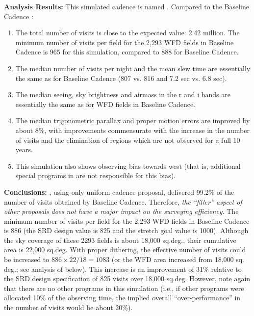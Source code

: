 {\bf Analysis Results:} This simulated cadence is named .
Compared to the Baseline Cadence :
\begin{enumerate}
\item The total number of visits is close to the expected value: 2.42
  million.  The minimum number of visits per field for the 2,293 WFD
  fields in Baseline Cadence is 965 for this simulation, compared to
  888 for Baseline Cadence.
\item The median number of visits per night and the mean slew time are
  essentially the same as for Baseline Cadence (807 vs. 816 and 7.2
  sec vs. 6.8 sec).
\item The median seeing, sky brightness and airmass in the r and i bands are
      essentially the same as for WFD fields in Baseline Cadence.
\item The median trigonometric parallax and proper motion errors are
  improved by about 8\%, with improvements commensurate with the
  increase in the number of visits and the elimination of regions
  which are not observed for a full 10 years.
\item This simulation also shows observing bias towards west (that is,
  additional special programs in  are not
  responsible for this bias).
\end{enumerate}


{\bf Conclusions:} , using only uniform cadence
proposal, delivered 99.2\% of the number of visits obtained by
Baseline Cadence. Therefore, {\it the ``filler'' aspect of other
proposals does not have a major impact on the surveying efficiency}.
The minimum number of visits per field for the 2,293 WFD fields in
Baseline Cadence is 886 (the SRD design value is 825 and the stretch
goal value is 1000). Although the sky coverage of these 2293 fields is
about 18,000 sq.deg., their cumulative area is 22,000 sq.deg. With
proper dithering, the effective number of visits could be increased to
$886\times22/18 = 1083$ (or the WFD area increased from 18,000 sq. deg.; see
analysis of  below). This increase is an improvement of 31\%
relative to the SRD design specification of 825 visits over 18,000
sq.deg. However, note again that there are no other programs in this
simulation (i.e., if other programs were allocated 10\% of the
observing time, the implied overall ``over-performance'' in the number
of  visits would be about 20\%).


